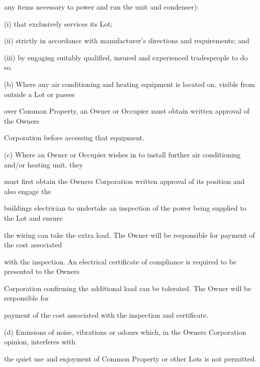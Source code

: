 \documentclass{article}
\begin{document}
{\fontsize{10.02}{1}any items necessary to power and run the unit and condenser): }

{\fontsize{9.962}{1}(i) that exclusively services its Lot; }

{\fontsize{9.962}{1}(ii) strictly in accordance with manufacturer’s directions and requirements; and }

{\fontsize{9.962}{1}(iii) by engaging suitably qualified, insured and experienced tradespeople to do so. }

{\fontsize{9.962}{1}(b) Where any air conditioning and heating equipment is located on, visible from outside a Lot or passes }

{\fontsize{10.02}{1}over Common Property, an Owner or Occupier must obtain written approval of the Owners }

{\fontsize{10.02}{1}Corporation before accessing that equipment. }

{\fontsize{9.962}{1}(c) Where an Owner or Occupier wishes in to install further air conditioning and/or heating unit, they }

{\fontsize{10.02}{1}must first obtain the Owners Corporation written approval of its position and also engage the }

{\fontsize{10.02}{1}buildings electrician to undertake an inspection of the power being supplied to the Lot and ensure }

{\fontsize{10.02}{1}the wiring can take the extra load. The Owner will be responsible for payment of the cost associated }

{\fontsize{10.02}{1}with the inspection. An electrical certificate of compliance is required to be presented to the Owners }

{\fontsize{10.02}{1}Corporation confirming the additional load can be tolerated. The Owner will be responsible for }

{\fontsize{10.02}{1}payment of the cost associated with the inspection and certificate. }

{\fontsize{9.962}{1}(d) Emissions of noise, vibrations or odours which, in the Owners Corporation opinion, interferes with }

{\fontsize{10.02}{1}the quiet use and enjoyment of Common Property or other Lots is not permitted. }

\newpage
\end{document}
